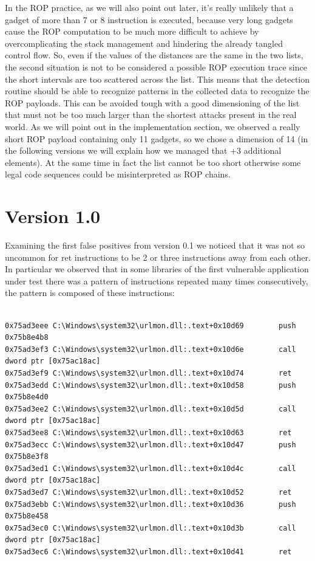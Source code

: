 \documentclass[Lau,binding=0.6cm]{sapthesis}
\begin{document}
In the ROP practice, as we will also point out later, it’s really unlikely that a gadget of more than 7 or 8 instruction is executed, because very long gadgets cause the ROP computation to be much more difficult to achieve by overcomplicating the stack management and hindering the already tangled control flow.
So, even if the values of the distances are the same in the two lists, the second situation is not to be considered a possible ROP execution trace since the short intervals are too scattered across the list. This means that the detection routine should be able to recognize patterns in the collected data to recognize the ROP payloads. This can be avoided tough with a good dimensioning of the list that must not be too much larger than the shortest attacks present in the real world. As we will point out in the implementation section, we observed a really short ROP payload containing only 11 gadgets, so we chose a dimension of 14 (in the following versions we will explain how we managed that +3 additional elements). At the same time in fact the list cannot be too short otherwise some legal code sequences could be misinterpreted as ROP chains.

\section{Version 1.0}

Examining the first false positives from version 0.1 we noticed that it was not so uncommon for ret instructions to be 2 or three instructions away from each other. In particular we observed that in some libraries of the first vulnerable application under test there was a pattern of instructions repeated many times consecutively, the pattern is composed of these instructions:


\begingroup
    \fontsize{8pt}{9pt}\selectfont
\begin{verbatim}

0x75ad3eee C:\Windows\system32\urlmon.dll:.text+0x10d69        push 0x75b8e4b8
0x75ad3ef3 C:\Windows\system32\urlmon.dll:.text+0x10d6e        call dword ptr [0x75ac18ac]
0x75ad3ef9 C:\Windows\system32\urlmon.dll:.text+0x10d74        ret 
0x75ad3edd C:\Windows\system32\urlmon.dll:.text+0x10d58        push 0x75b8e4d0
0x75ad3ee2 C:\Windows\system32\urlmon.dll:.text+0x10d5d        call dword ptr [0x75ac18ac]
0x75ad3ee8 C:\Windows\system32\urlmon.dll:.text+0x10d63        ret 
0x75ad3ecc C:\Windows\system32\urlmon.dll:.text+0x10d47        push 0x75b8e3f8
0x75ad3ed1 C:\Windows\system32\urlmon.dll:.text+0x10d4c        call dword ptr [0x75ac18ac]
0x75ad3ed7 C:\Windows\system32\urlmon.dll:.text+0x10d52        ret 
0x75ad3ebb C:\Windows\system32\urlmon.dll:.text+0x10d36        push 0x75b8e458
0x75ad3ec0 C:\Windows\system32\urlmon.dll:.text+0x10d3b        call dword ptr [0x75ac18ac]
0x75ad3ec6 C:\Windows\system32\urlmon.dll:.text+0x10d41        ret 

\end{verbatim}
\endgroup
\end{document}
